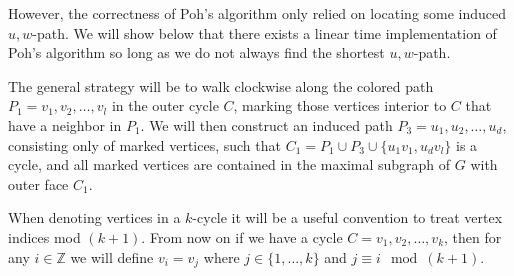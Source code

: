 \documentclass[12pt,letterpaper]{article}
\theoremstyle{plain}
\theoremstyle{definition}
\theoremstyle{break}
\begin{document}
However, the correctness of Poh's algorithm only relied on
locating some induced $u,w$-path.
We will show below that there exists a linear time implementation of Poh's
algorithm so long as we do not always find the shortest $u,w$-path.

The general strategy will be to walk clockwise along the colored path
$P_1=v_1,v_2,\ldots,v_l$ in the outer cycle $C$, marking those vertices
interior to $C$ that have a neighbor in $P_1$. We will then construct an
induced path $P_3=u_1,u_2,\ldots,u_d$, consisting only of marked vertices,
such that $C_1=P_1\cup P_3\cup\{u_1v_1,u_dv_l\}$ is a cycle, and all marked
vertices are contained in the maximal subgraph of $G$ with outer face $C_1$.

When denoting vertices in a $k$-cycle
it will be a useful convention to treat
vertex indices mod $(k+1)$. From now on if we have a cycle
$C=v_1,v_2,\ldots,v_k$, then for any $i\in\mathbb{Z}$ we will define
$v_i=v_j$ where $j\in\{1,\ldots,k\}$ and $j\equiv i\mod (k+1)$.
\end{document}
